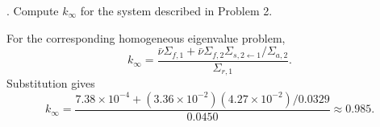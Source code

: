 \newpage

. Compute $k_{\infty}$ for the system described in
Problem 2.

\begin{adaptedsolution}
For the corresponding homogeneous eigenvalue problem,
\[
 k_\infty
 =\frac{\bar{\nu}\Sigma_{f,1}
 +\bar{\nu}\Sigma_{f,2}\Sigma_{s,2\gets1}/\Sigma_{a,2}}
 {\Sigma_{r,1}}.
\]
Substitution gives
\[
 k_\infty
 =\frac{7.38\times10^{-4}
 +(3.36\times10^{-2})(4.27\times10^{-2})/0.0329}
 {0.0450}
 \approx \boxed{0.985}.
\]
\end{adaptedsolution}

\clearpage
